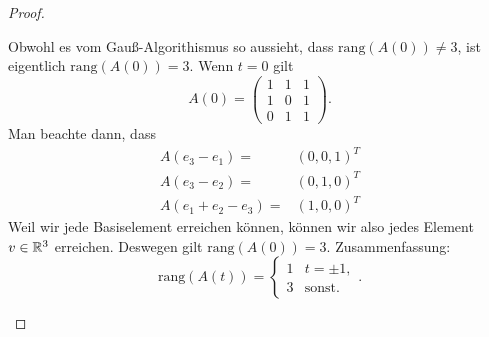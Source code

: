 \begin{proof}
\begin{parts}
Obwohl es vom Gauß-Algorithismus so aussieht, dass  $\text{rang}(A(0))\neq 3$, ist eigentlich $\text{rang}(A(0))=3$. Wenn $t=0$ gilt
\[
	A(0)=\begin{pmatrix} 1 & 1 & 1 \\ 1 & 0 & 1 \\ 0 & 1 & 1 \end{pmatrix} 
.\] 
Man beachte dann, dass
\begin{align*}
	A(e_3-e_1)=&(0,0,1)^T\\
	A(e_3-e_2)=&(0,1,0)^T\\
	A(e_1+e_2-e_3)=&(1,0,0)^T
\end{align*}
Weil wir jede Basiselement erreichen können, können wir also jedes Element $v\in \mathbb{R}^3$ erreichen. Deswegen gilt $\text{rang}(A(0))=3$. Zusammenfassung:
\[
	\text{rang}(A(t))=\begin{cases}
		1 & t=\pm 1,\\
		3 & \text{sonst.}
	\end{cases}
.\] 


\end{parts}
\end{proof}
